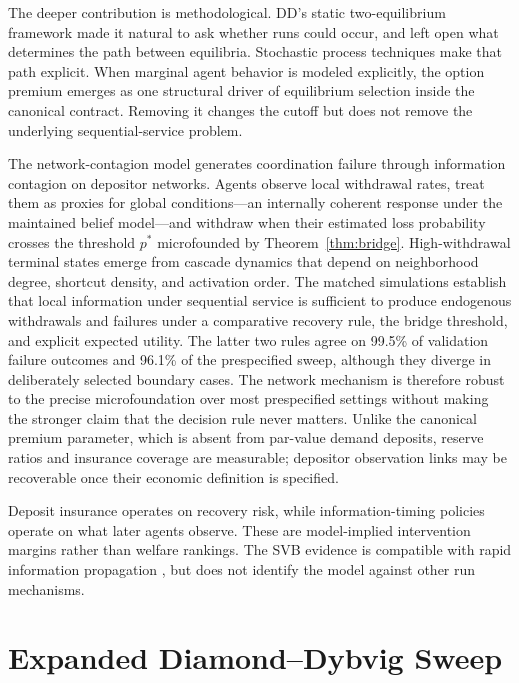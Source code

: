 \documentclass[12pt]{article}\usepackage[]{graphicx}\usepackage[]{xcolor}
\begin{document}
The deeper contribution is methodological.
DD's static two-equilibrium framework made it natural to ask whether runs could occur, and left open what determines the path between equilibria.
Stochastic process techniques make that path explicit.
When marginal agent behavior is modeled explicitly, the option premium emerges as one structural driver of equilibrium selection inside the canonical contract.
Removing it changes the cutoff but does not remove the underlying sequential-service problem.

The network-contagion model generates coordination failure through information contagion on depositor networks.
Agents observe local withdrawal rates, treat them as proxies for global conditions---an internally coherent response under the maintained belief model---and withdraw when their estimated loss probability crosses the threshold $p^*$ microfounded by Theorem~\ref{thm:bridge}.
High-withdrawal terminal states emerge from cascade dynamics that depend on neighborhood degree, shortcut density, and activation order.
The matched simulations establish that local information under sequential service is sufficient to produce endogenous withdrawals and failures under a comparative recovery rule, the bridge threshold, and explicit expected utility.
The latter two rules agree on 99.5\% of validation failure outcomes and 96.1\% of the prespecified sweep, although they diverge in deliberately selected boundary cases.
The network mechanism is therefore robust to the precise microfoundation over most prespecified settings without making the stronger claim that the decision rule never matters.
Unlike the canonical premium parameter, which is absent from par-value demand deposits, reserve ratios and insurance coverage are measurable; depositor observation links may be recoverable once their economic definition is specified.

Deposit insurance operates on recovery risk, while information-timing policies operate on what later agents observe.
These are model-implied intervention margins rather than welfare rankings.
The SVB evidence is compatible with rapid information propagation \citep{cookson2023social}, but does not identify the model against other run mechanisms.


\appendix

\section{Expanded Diamond--Dybvig Sweep}
\label{app:ddsweep}
\end{document}
